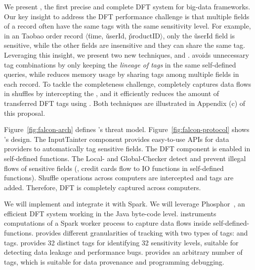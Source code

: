 We present \kakute, the first precise and complete DFT system for big-data 
frameworks. Our key insight to address the DFT performance challenge is that 
multiple fields of a record often have the same tags with the same sensitivity 
level. For example, in an Taobao order record $\langle$\v{time}, 
\v{userId}, \v{productID}$\rangle$, only the \v{userId} field is 
sensitive, while the other fields are insensitive and they can share the same 
tag. Leveraging this insight, we present two new techniques, \lazyp and 
\tagcache. \lazyp avoids unnecessary tag combinations by only keeping the 
\textit{lineage of tags} in the same self-defined queries, while \tagcache 
reduces memory usage by sharing tags among multiple fields in each record. To 
tackle the completeness challenge, \kakute completely captures data flows in 
shuffles by intercepting the , and it efficiently reduces the amount of 
transferred DFT tags using \tagcache. Both techniques are illustrated in 
Appendix (c) of this proposal.

Figure~\ref{fig:falcon-arch} defines \kakute's threat 
model. Figure~\ref{fig:falcon-protocol} shows \kakute's design. The 
InputTainter component provides easy-to-use APIs for data providers to 
automatically tag sensitive fields. The DFT component is enabled in 
self-defined functions. The Local- and Global-Checker detect and 
prevent illegal flows of sensitive fields (\eg, credit cards flow to IO 
functions in self-defined functions). Shuffle operations across computers are 
intercepted and tags are added. Therefore, DFT is completely captured across 
computers.

We will implement \kakute and integrate it with Spark. We will leverage 
Phosphor~\cite{oo14:phosphor}, an efficient DFT system working in the Java 
byte-code level. \kakute instruments computations of a Spark worker process
to capture data flows inside self-defined-functions. \kakute provides different 
granularities of tracking with two types of tags: 
and  tags.  provides 32 distinct tags for 
identifying 32 sensitivity levels, suitable for detecting data leakage and 
performance bugs.  provides an arbitrary number of tags, which is 
suitable for data provenance and programming debugging.

